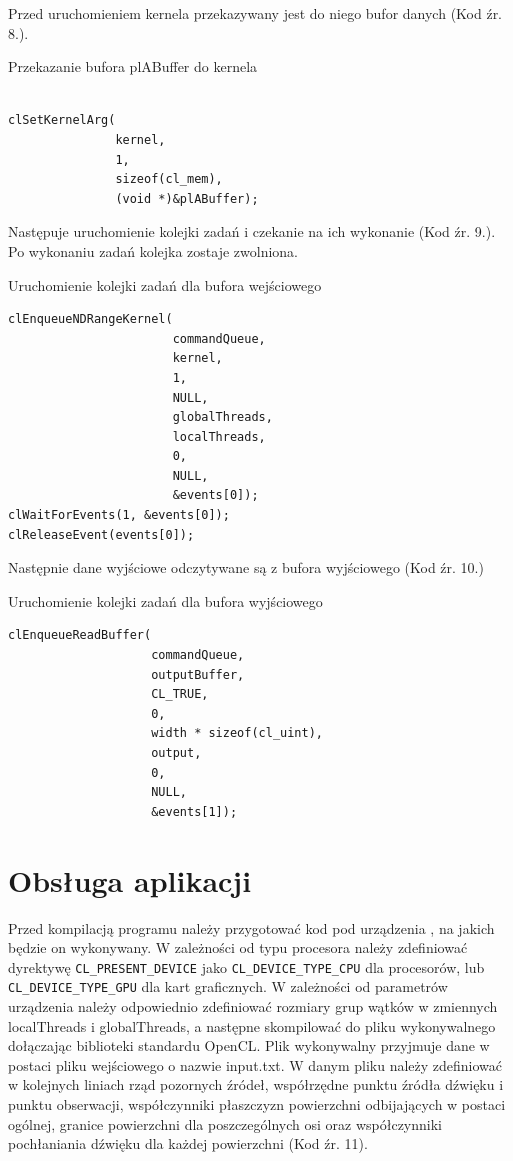 Przed uruchomieniem kernela przekazywany jest do niego bufor danych (Kod źr. 8.).
\begin{program}
\caption{Przekazanie bufora plABuffer do kernela}
\begin{lstlisting}

clSetKernelArg(
               kernel, 
               1, 
               sizeof(cl_mem), 
               (void *)&plABuffer);
\end{lstlisting}
\end{program}
Następuje uruchomienie kolejki zadań i czekanie na ich wykonanie (Kod źr. 9.). Po wykonaniu zadań kolejka zostaje zwolniona.
\begin{program}
\caption{Uruchomienie kolejki zadań dla bufora wejściowego}
\begin{lstlisting}
clEnqueueNDRangeKernel(
                       commandQueue,
                       kernel,
                       1,
                       NULL,
                       globalThreads,
                       localThreads,
                       0,
                       NULL,
                       &events[0]);
clWaitForEvents(1, &events[0]);
clReleaseEvent(events[0]);
\end{lstlisting}
\end{program}
Następnie dane wyjściowe odczytywane są z bufora wyjściowego (Kod źr. 10.)
\begin{program}
\caption{Uruchomienie kolejki zadań dla bufora wyjściowego}
\begin{lstlisting}
clEnqueueReadBuffer(
                    commandQueue,
                    outputBuffer,
                    CL_TRUE,
                    0,
                    width * sizeof(cl_uint),
                    output,
                    0,
                    NULL,
                    &events[1]);
\end{lstlisting}
\end{program}



\section{Obsługa aplikacji}\label{sec:oa}

Przed kompilacją programu należy przygotować kod pod urządzenia , na jakich  będzie on wykonywany. W zależności od typu procesora należy zdefiniować dyrektywę \verb|CL_PRESENT_DEVICE| jako \verb|CL_DEVICE_TYPE_CPU| dla procesorów, lub \verb|CL_DEVICE_TYPE_GPU| dla kart graficznych. W zależności od parametrów urządzenia należy odpowiednio zdefiniować rozmiary grup wątków w zmiennych localThreads i globalThreads, a następne skompilować do pliku wykonywalnego dołączając biblioteki standardu OpenCL. Plik wykonywalny przyjmuje dane w postaci pliku wejściowego o nazwie input.txt. W danym pliku należy zdefiniować w kolejnych liniach  rząd pozornych źródeł, współrzędne punktu źródła dźwięku i punktu obserwacji, współczynniki płaszczyzn powierzchni odbijających w postaci ogólnej, granice powierzchni dla poszczególnych osi oraz współczynniki pochłaniania dźwięku dla każdej powierzchni (Kod źr. 11).

